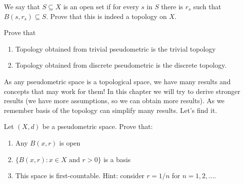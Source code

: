\begin{prob}
	We say that $S\subseteq X$ is an open set if for every $s$ in $S$ there is $r_s$ such that $B(s,r_s)\subseteq S$. 
	Prove that this is indeed a topology on $X$.
\end{prob}

\begin{prob}
	Prove that
	\begin{enumerate}
		\item Topology obtained from trivial pseudometric is the trivial topology
		\item Topology obtained from discrete pseudometric is the discrete topology.
	\end{enumerate}
\end{prob}

As any pseudometric space is a topological space, we have many results and concepts that may work for them! In this chapter we will try to derive
stronger results (we have more assumptions, so we can obtain more results). As we remember basis of the topology can simplify many results. Let's
find it.

\begin{prob}
	Let $(X,d)$ be a pseudometric space. Prove that:
	\begin{enumerate}
		\item Any $B(x,r)$ is open
		\item $\{B(x,r) : x\in X \text{ and }r > 0\}$ is a basis
		\item This space is first-countable. Hint: consider $r=1/n$ for $n=1,2,\dots$. 
	\end{enumerate}
\end{prob} 

